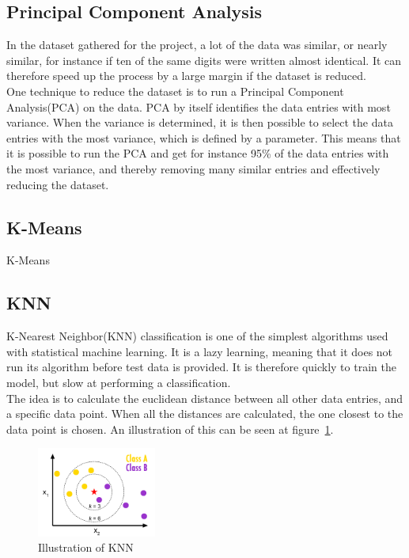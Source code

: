 \documentclass[report]{subfiles}
\begin{document}
\subsection{Principal Component Analysis}
\label{sec:PCA}
In the dataset gathered for the project, a lot of the data was similar, or nearly similar, for instance if ten of the same digits were written almost identical. It can therefore speed up the process by a large margin if the dataset is reduced.\\
One technique to reduce the dataset is to run a Principal Component Analysis(PCA) on the data. PCA by itself identifies the data entries with most variance. When the variance is determined, it is then possible to select the data entries with the most variance, which is defined by a parameter. This means that it is possible to run the PCA and get for instance 95\% of the data entries with the most variance, and thereby removing many similar entries and effectively reducing the dataset.\\
{\color{red}{TODO should we explain more about the covariance, Eigenvectors and Eigenvalues?}}

\subsection{K-Means}
K-Means

\subsection{KNN}
K-Nearest Neighbor(KNN) classification is one of the simplest algorithms used with statistical machine learning. It is a lazy learning, meaning that it does not run its algorithm before test data is provided. It is therefore quickly to train the model, but slow at performing a classification.\\
The idea is to calculate the euclidean distance between all other data entries, and a specific data point. When all the distances are calculated, the one closest to the data point is chosen. An illustration of this can be seen at figure~\ref{fig:knnExp}.

\begin{figure}[H]
	\centering
	\includegraphics[width=0.35\textwidth]{images/knnExp}
	\caption{Illustration of KNN}
	\label{fig:knnExp}
\end{figure}
\end{document}

